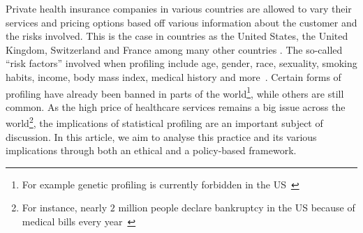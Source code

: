 Private health insurance companies in various countries are allowed to vary their services and pricing options based off various information about the customer and the risks involved. This is the case in countries as the United States, the United Kingdom, Switzerland and France among many other countries \cite{odihi20}. The so-called ``risk factors'' involved when profiling include age, gender, race, sexuality, smoking habits, income, body mass index, medical history and more~\cite{odihi20}. Certain forms of profiling have already been banned in parts of the world\footnote{For example genetic profiling is currently forbidden in the US~\cite{genetic-info-nondiscrimination}}, while others are still common. As the high price of healthcare services remains a big issue across the world\footnote{For instance, nearly $2$ million people declare bankruptcy in the US because of medical bills every year~\cite{medical-bills-us-bankrupcy}}, the implications of statistical profiling are an important subject of discussion. In this article, we aim to analyse this practice and its various implications through both an ethical and a policy-based framework.
